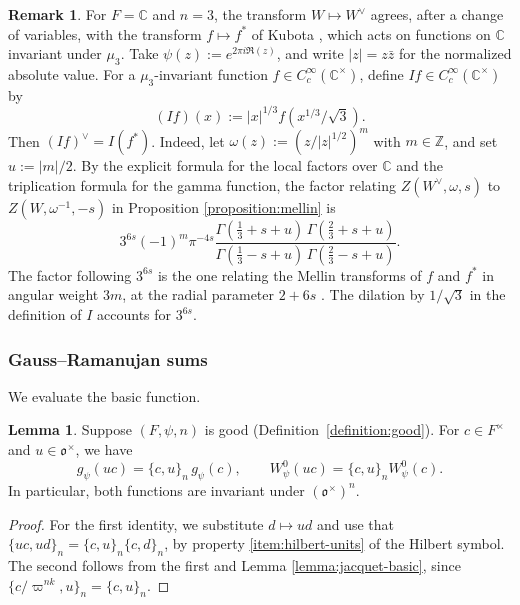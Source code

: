 \documentclass[reqno]{amsart}
\theoremstyle{plain}
\theoremstyle{definition}
\newtheorem{remark}[theorem]{Remark}
\theoremstyle{itplain}
\newtheorem{lemma}[theorem]{Lemma}
\numberwithin{equation}{section}
\numberwithin{theorem}{section}
\begin{document}
\begin{remark}\label{remark:kubota-transform}
  For $F = \mathbb{C}$ and $n = 3$, the transform $W \mapsto W^\vee$ agrees, after a change of variables, with the transform $f \mapsto f^*$ of Kubota \cite[(5)]{Kubota+1974+180+189}, which acts on functions on $\mathbb{C}$ invariant under $\mu_3$.  Take $\psi(z) := e^{2 \pi i \Re(z)}$, and write $\lvert z \rvert = z \bar{z}$ for the normalized absolute value.  For a $\mu_3$-invariant function $f \in C_c^\infty(\mathbb{C}^\times)$, define $I f \in C_c^\infty(\mathbb{C}^\times)$ by
  \begin{equation*}
    (I f)(x) := \lvert x \rvert^{1/3} f(x^{1/3} / \sqrt{3}).
  \end{equation*}
  Then $(I f)^\vee = I(f^*)$.  Indeed, let $\omega(z) := (z / \lvert z \rvert^{1/2})^m$ with $m \in \mathbb{Z}$, and set $u := \lvert m \rvert / 2$.  By the explicit formula for the local factors over $\mathbb{C}$ \cite{MR0217026} and the triplication formula for the gamma function, the factor relating $Z(W^\vee, \omega, s)$ to $Z(W, \omega^{-1}, -s)$ in Proposition \ref{proposition:mellin} is
  \begin{equation*}
    3^{6 s} (-1)^m \pi^{-4 s}
    \frac{\Gamma(\tfrac{1}{3} + s + u) \, \Gamma(\tfrac{2}{3} + s + u)}
    {\Gamma(\tfrac{1}{3} - s + u) \, \Gamma(\tfrac{2}{3} - s + u)}.
  \end{equation*}
  The factor following $3^{6 s}$ is the one relating the Mellin transforms of $f$ and $f^*$ in angular weight $3 m$, at the radial parameter $2 + 6 s$ \cite[p.~187]{Kubota+1974+180+189}.  The dilation by $1 / \sqrt{3}$ in the definition of $I$ accounts for $3^{6 s}$.
\end{remark}

\subsubsection{Gauss--Ramanujan sums}\label{sec:gauss-ramanujan-sums}
We evaluate the basic function.

\begin{lemma}\label{lemma:gauss-ramanujan}
  Suppose $(F, \psi, n)$ is good (Definition~\ref{definition:good}).  For $c \in F^\times$ and $u \in \mathfrak{o}^\times$, we have
  \begin{equation*}
    g_\psi(u c) = \{c, u\}_n \, g_\psi(c),
    \qquad
    W_\psi^0(u c) = \{c, u\}_n W_\psi^0(c).
  \end{equation*}
  In particular, both functions are invariant under $(\mathfrak{o}^\times)^n$.
\end{lemma}
\begin{proof}
  For the first identity, we substitute $d \mapsto u d$ and use that $\{u c, u d\}_n = \{c, u\}_n \{c, d\}_n$, by property \eqref{item:hilbert-units} of the Hilbert symbol.  The second follows from the first and Lemma \ref{lemma:jacquet-basic}, since $\{c / \varpi^{n k}, u\}_n = \{c, u\}_n$.
\end{proof}
\end{document}
